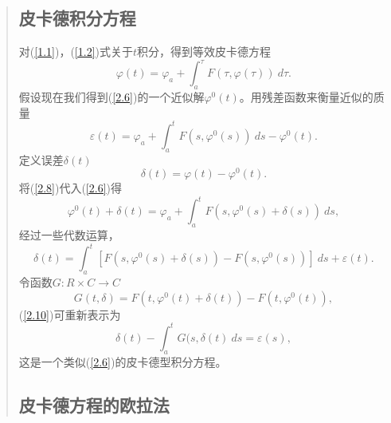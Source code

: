 \documentclass{article}
\begin{document}
\begin{CJK}{UTF8}{gkai}
\begin{quotation}
\subsection{皮卡德积分方程}
对(\ref{1.1})，(\ref{1.2})式关于$t$积分，得到等效皮卡德方程\\
\begin{equation}
\label{2.6}
\varphi(t)=\varphi_a + \int _{a}^{\tau} F(\tau,\varphi(\tau))~d\tau.
\end{equation}
假设现在我们得到(\ref{2.6})的一个近似解$\varphi^0(t)$。用残差函数来衡量近似的质量\\
\begin{equation}
\label{2.7}
\varepsilon(t)=\varphi_a + \int_{a}^{t} F(s,\varphi^0(s))~ds-\varphi^0(t).
\end{equation}
定义误差$\delta(t)$\\
\begin{equation}
\label{2.8}
\delta(t)=\varphi(t)-\varphi^0(t).
\end{equation}
将(\ref{2.8})代入(\ref{2.6})得\\
\begin{equation}
\varphi ^0(t)+\delta(t)=\varphi_a+\int _{a}^{t}F(s,\varphi^0(s)+\delta(s))~ds,
\end{equation}
经过一些代数运算，\\
\begin{equation}
\label{2.10}
\delta(t)=\int _{a}^{t}[F(s,\varphi^0(s)+\delta(s))-F(s,\varphi^0(s))]~ds+\varepsilon(t).
\end{equation}
令函数$G:R \times C \rightarrow C$\\
\begin{equation}
\label{2.11}
G(t,\delta)= F(t,\varphi^0(t)+\delta(t))-F(t,\varphi^0(t)),
\end{equation}
(\ref{2.10})可重新表示为\\
\begin{equation}
\label{2.12}
\delta(t)- \int_{a}^{t}G(s,\delta(t)~ds=\varepsilon(s),
\end{equation}
这是一个类似(\ref{2.6})的皮卡德型积分方程。\\
\subsection{皮卡德方程的欧拉法}


\end{quotation}
\end{CJK}
\end{document}
